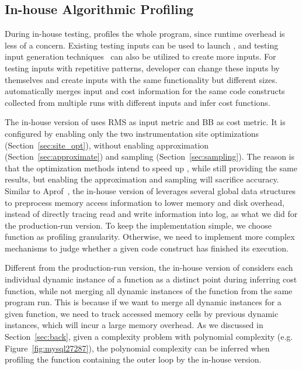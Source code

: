 \subsection{In-house Algorithmic Profiling}
\label{sec:in-house}

During in-house testing, \Tool profiles the whole program, 
since runtime overhead is less of a concern. 
Existing testing inputs can be used to launch \Tool, 
and testing input generation techniques~\cite{KLEE,dart,s2e} 
can also be utilized to create more inputs.
For testing inputs with repetitive patterns, 
developer can change these inputs by themselves 
and create inputs with the same functionality but different sizes. 
\Tool automatically merges input and cost information 
for the same code constructs
collected from multiple runs with different inputs and infer cost functions. 


The in-house version of \Tool uses RMS as input metric and BB
as cost metric.
It is configured by enabling only the two instrumentation site optimizations 
(Section~\ref{sec:site_opt}), without enabling approximation (Section~\ref{sec:approximate})
and sampling (Section~\ref{sec:sampling}). 
The reason is that the optimization methods intend to speed up \Tool, 
while still providing the same results, 
but enabling the approximation and sampling will sacrifice accuracy. 
Similar to Aprof~\cite{Aprof1,Aprof2}, 
the in-house version of \Tool leverages several global data structures
to preprocess memory access information to lower memory and disk overhead,
instead of directly tracing read and write information into log, 
as what we did for the production-run version. 
To keep the implementation simple, 
we choose function as profiling granularity.
Otherwise, we need to implement more complex 
mechanisms to judge whether a given code construct 
has finished its execution.  

Different from the production-run version, the in-house version of \Tool 
considers each individual dynamic instance of a function 
as a distinct point during inferring cost function, 
while not merging all dynamic instances of the function 
from the same program run.
This is because if we want to merge all dynamic instances for a given function, 
we need to track accessed memory cells by previous dynamic instances, 
which will incur a large memory overhead. 
As we discussed in Section~\ref{sec:back}, 
given a complexity problem with polynomial complexity 
(e.g. Figure~\ref{fig:mysql27287}),  
the polynomial complexity can be inferred when profiling 
the function containing the outer loop by the in-house version.

